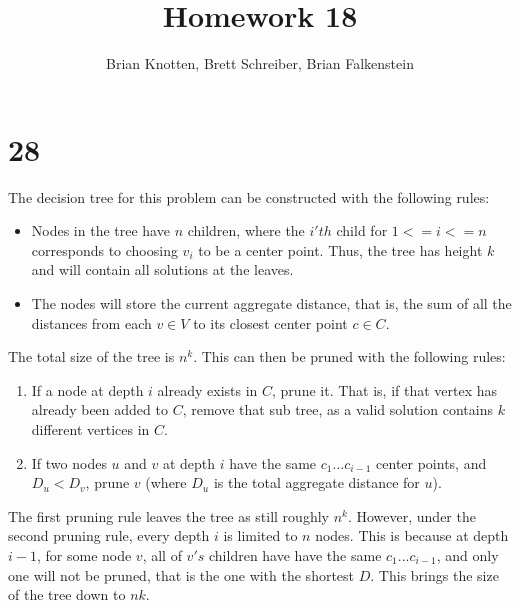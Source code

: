 \documentclass[letterpaper,notitlepage,twoside]{article}
\begin{document}
\title{Homework 18}
\author{Brian Knotten, Brett Schreiber, Brian Falkenstein}
\maketitle

\section*{28}
The decision tree for this problem can be constructed with the following rules:
\begin{itemize}
\item Nodes in the tree have $n$ children, where the $i'th$ child for $1<=i<=n$ corresponds to choosing $v_i$ to be a center point. Thus, the tree has height $k$ and will contain all solutions at the leaves.  
\item The nodes will store the current aggregate distance, that is, the sum of all the distances from each $v\in V$ to its closest center point $c\in C$. 
\end{itemize}
The total size of the tree is $n^k$. This can then be pruned with the following rules:
\begin{enumerate}
\item If a node at depth $i$ already exists in $C$, prune it. That is, if that vertex has already been added to $C$, remove that sub tree, as a valid solution contains $k$ different vertices in $C$. 
\item If two nodes $u$ and $v$ at depth $i$ have the same $c_1...c_{i-1}$ center points, and $D_u < D_v$, prune $v$ (where $D_u$ is the total aggregate distance for $u$). 
\end {enumerate}
The first pruning rule leaves the tree as still roughly $n^k$. However, under the second pruning rule, every depth $i$ is limited to $n$ nodes. This is because at depth $i-1$, for some node $v$, all of $v's$ children have have the same $c_1...c_{i-1}$, and only one will not be pruned, that is the one with the shortest $D$. This brings the size of the tree down to $nk$.
\end{document}
